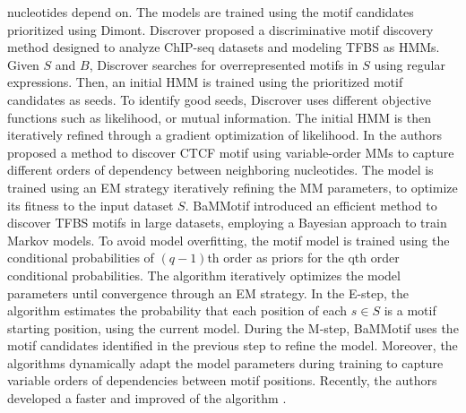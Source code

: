 \documentclass[a4paper, titlepage, openright]{book}
\begin{document}
nucleotides depend on. The models are trained using the motif candidates prioritized using Dimont. Discrover \citep{maaskola2014binding} proposed a discriminative motif discovery method designed to analyze ChIP-seq datasets and modeling TFBS as HMMs. Given $S$ and $B$, Discrover searches for overrepresented motifs in $S$ using regular expressions. Then, an initial HMM is trained using the prioritized motif candidates as seeds. To identify good seeds, Discrover uses different objective functions such as likelihood, or mutual information. The initial HMM is then iteratively refined through a gradient optimization of likelihood. In \citep{eggeling2014value} the authors proposed a method to discover CTCF \citep{bell1999protein} motif using variable-order MMs to capture different orders of dependency between neighboring nucleotides. The model is trained using an EM strategy iteratively refining the MM parameters, to optimize its fitness to the input dataset $S$. BaMMotif \citep{siebert2016bayesian} introduced an efficient method to discover TFBS motifs in large datasets, employing a Bayesian approach to train Markov models. To avoid model overfitting, the motif model is trained using the conditional probabilities of $(q-1)$th order as priors for the qth order conditional probabilities. The algorithm iteratively optimizes the model parameters until convergence through an EM strategy. In the E-step, the algorithm estimates the probability that each position of each $s \in S$ is a motif starting position, using the current model. During the M-step, BaMMotif uses the motif candidates identified in the previous step to refine the model. Moreover, the algorithms dynamically adapt the model parameters during training to capture variable orders of dependencies between motif positions. Recently, the authors developed a faster and improved of the algorithm \citep{ge2021bayesian}.
\end{document}
